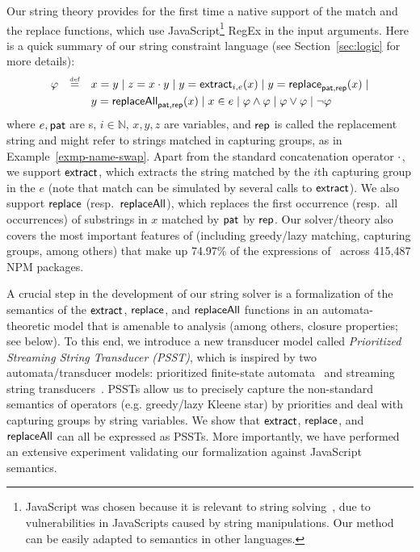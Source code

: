 Our string theory provides for the first time a native support of the match and the 
replace functions, which use JavaScript\footnote{JavaScript was chosen 
because it is relevant to string solving~\cite{BEK,Berkeley-JavaScript}, due to vulnerabilities in JavaScripts 
caused by string manipulations. Our method can be easily adapted to \regexp{}
semantics in other languages.} RegEx in the input arguments. Here is a quick
summary of our string constraint language (see Section~\ref{sec:logic} for
more details):
\[
\begin{array}{l c l}
\smallskip
\varphi & \eqdef  & x = y \mid z = x \concat y \mid y  = \extract_{i, e}(x) \mid
y  = \replace_{\pat, \rep}(x) \mid 
\\
& & y = \replaceall_{\pat, \rep}(x)   \mid
 x \in e \mid \varphi \wedge \varphi \mid \varphi \vee \varphi \mid \neg \varphi \
\label{eq:SL-intro}
\end{array}
\]
where $e, \mathsf{pat}$ are \regexp{}s, $i \in \mathbb{N}$, $x,y,z$ are variables, and $\mathsf{rep}$ 
is called the
replacement string and might refer to strings matched in capturing groups,
as in Example~\ref{exmp-name-swap}. Apart from the standard concatenation
operator $\cdot$, we support $\mathsf{extract}$, which extracts the string matched by
the $i$th capturing group in the \regexp{} $e$ (note that match can be simulated
by several calls to $\mathsf{extract}$). We also support $\mathsf{replace}$ 
(resp.~$\mathsf{replaceAll}$), which replaces the first occurrence (resp.~all
occurrences) of substrings in $x$ matched by $\mathsf{pat}$ by $\mathsf{rep}$. Our solver/theory
also covers the most important features of \regexp{} (including greedy/lazy
matching, capturing groups, among others) that make up 74.97\% of the \regexp{}
expressions of~\cite{LMK19} across 415,487 NPM packages. 

A crucial step in the development of our string solver is a formalization of
the semantics of the $\mathsf{extract}$, $\mathsf{replace}$, and $\mathsf{replaceAll}$ functions in
an automata-theoretic model that is amenable to analysis (among others, closure
properties; see below).
%
To this end, we introduce a new 
transducer model called \emph{Prioritized Streaming String Transducer (PSST)},
which is inspired by %
two automata/transducer models: prioritized finite-state automata~\cite{BM17} 
and streaming string transducers~\cite{AC10,AD11}. PSSTs allow us to precisely
capture the non-standard semantics of \regexp{} operators (e.g. greedy/lazy Kleene star) by priorities and 
deal with capturing groups by string variables. 
We show that $\mathsf{extract}$, $\mathsf{replace}$, and $\mathsf{replaceAll}$ can all be expressed as 
PSSTs. More importantly, we have performed an extensive experiment
validating our formalization against JavaScript semantics. 

